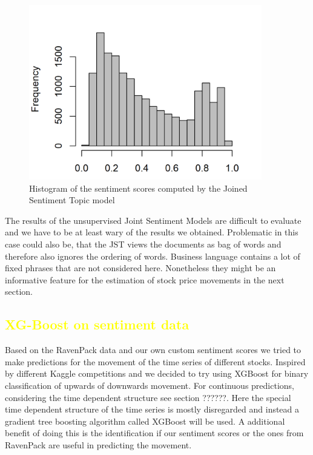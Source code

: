 \begin{figure}[h]
\centering
\includegraphics[width=4in]{figures/2SentimentsJST_Histogram.png}
\caption{Histogram of the sentiment scores computed by the Joined Sentiment Topic model}
\label{fig:JSTSentiment}
\end{figure}

The results of the unsupervised Joint Sentiment Models are difficult to evaluate and we have to be at least wary of the results we obtained. Problematic in this case could also be, that the JST views the documents as bag of words and therefore also ignores the ordering of words. Business language contains a lot of fixed phrases that are not considered here.  Nonetheless they might be an informative feature for the estimation of stock price movements in the next section. 


\subsection{\textcolor{yellow}{XG-Boost on sentiment data}}\label{sec:XGB}
Based on the RavenPack data and our own custom sentiment scores we tried to make predictions for the movement of the time series of different stocks. Inspired by different Kaggle competitions and \citep{li2018predicting} we decided to try using XGBoost for binary classification of upwards of downwards movement. For continuous predictions, considering the time dependent structure see section ??????. Here the special time dependent structure of the time series is mostly disregarded and instead a gradient tree boosting algorithm called XGBoost will be used. A additional benefit of doing this is the identification if our sentiment scores or the ones from RavenPack are useful in predicting the movement. \\

